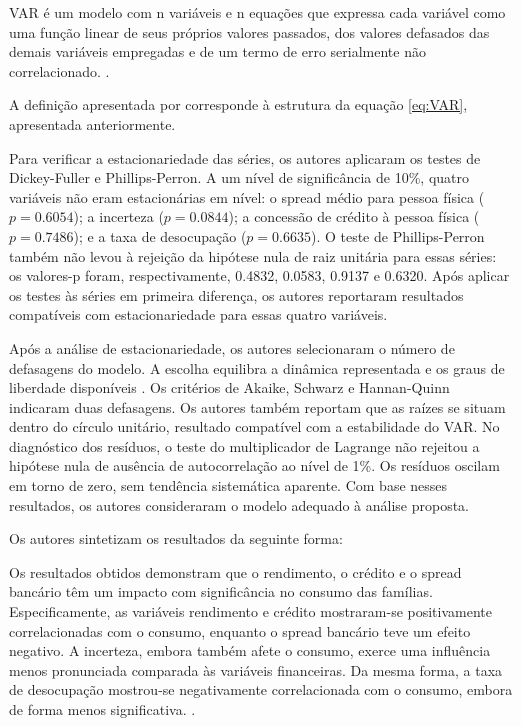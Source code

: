 \begin{citacao}
	VAR é um modelo com n variáveis e n equações que expressa cada variável como uma função linear de seus próprios valores passados, dos valores defasados das demais variáveis empregadas e de um termo de erro serialmente não  correlacionado. .
\end{citacao}
A definição apresentada por  corresponde à estrutura da equação \ref{eq:VAR}, apresentada anteriormente.

Para verificar a estacionariedade das séries, os autores aplicaram os testes de Dickey-Fuller e Phillips-Perron. A um nível de significância de 10\%, quatro variáveis não eram estacionárias em nível: o spread médio para pessoa física ($p=0.6054$); a incerteza ($p=0.0844$); a concessão de crédito à pessoa física ($p=0.7486$); e a taxa de desocupação ($p=0.6635$). O teste de Phillips-Perron também não levou à rejeição da hipótese nula de raiz unitária para essas séries: os valores-p foram, respectivamente, 0.4832, 0.0583, 0.9137 e 0.6320. Após aplicar os testes às séries em primeira diferença, os autores reportaram resultados compatíveis com estacionariedade para essas quatro variáveis.

Após a análise de estacionariedade, os autores selecionaram o número de defasagens do modelo. A escolha equilibra a dinâmica representada e os graus de liberdade disponíveis . Os critérios de Akaike, Schwarz e Hannan-Quinn indicaram duas defasagens. Os autores também reportam que as raízes se situam dentro do círculo unitário, resultado compatível com a estabilidade do VAR. No diagnóstico dos resíduos, o teste do multiplicador de Lagrange não rejeitou a hipótese nula de ausência de autocorrelação ao nível de 1\%. Os resíduos oscilam em torno de zero, sem tendência sistemática aparente. Com base nesses resultados, os autores consideraram o modelo adequado à análise proposta.

Os autores sintetizam os resultados da seguinte forma:

\begin{citacao}
	Os resultados obtidos demonstram que o rendimento, o crédito e o spread bancário têm um impacto com significância no consumo das famílias. Especificamente, as variáveis rendimento e crédito mostraram-se positivamente correlacionadas com o consumo, enquanto o spread bancário teve um efeito negativo. A incerteza, embora também afete o consumo, exerce uma influência menos pronunciada comparada às variáveis financeiras. Da mesma forma, a taxa de desocupação mostrou-se negativamente correlacionada com o consumo, embora de forma menos significativa. .
\end{citacao}

